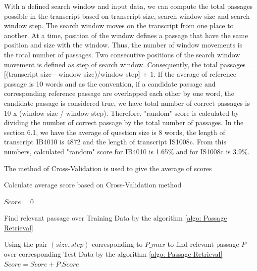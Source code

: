 \documentclass[10pt,a4paper]{article}
\numberwithin{algorithm}{section}  %
\begin{document}
With a defined search window and input data, we can compute the total passages possible in the transcript based on transcript size, search window size and search window step. The search window moves on the transcript from one place to another. At a time, position of the window defines a passage that have the same position and size with the window. Thus, the number of window movements is the total number of passages. Two consecutive positions of the search window movement is defined as step of search window. Consequently, the total passages = [(transcript size - window size)/window step] + 1.  If the average of reference passage is 10 words and as the convention, if a candidate passage and corresponding reference passage are overlapped each other by one word, the candidate passage is considered true, we have total number of correct passages is 10 x (window size / window step). Therefore, "random" score is calculated by dividing the number of correct passage by the total number of passages. In the section 6.1, we have the average of question size is 8 words, the length of transcript IB4010 is 4872 and the length of transcript IS1008c. From this numbers, calculated "random" score for IB4010 is 1.65\% and for IS1008c is 3.9\%.

%
%
%


The method of Cross-Validation is used to give the average of scores 

\begin{algorithm}
\caption{Calculate average score based on Cross-Validation method}
\label{alg: Cross-Validation}
\begin{algorithmic}
\STATE $Score = 0$

\STATE Find relevant passage over Training Data by the algorithm \ref{algo: Passage Retrieval}
			
			
\ENDFOR
\ENDFOR

\STATE 	Using the pair $(size,step)$ corresponding to $P\_max$
\STATE to find relevant passage $P$ over corresponding Test Data by the algorithm \ref{algo: Passage Retrieval}
\STATE $Score = Score + P.Score$
		
\ENDFOR
	

\end{algorithmic}
\end{algorithm}
\end{document}
